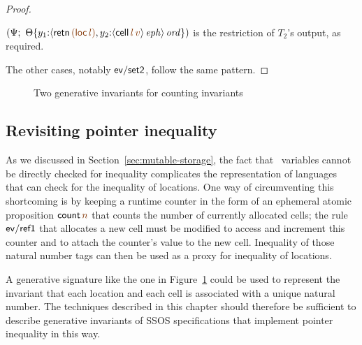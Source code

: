 \begin{proof}
\begin{description}
$\left(\Psi; ~
   \tackon{\Theta}{y_1{:}\istrue{\susp{{\sf retn}\,\lf{({\sf loc}\,\lf{l})},
                   y_2{:}\iseph{\susp{{\sf cell}\,\lf{l}\,\lf{v}}}}}}
   \right)$ is the restriction of $T_2$'s output, as
required.






\end{description}
The other cases, notably ${\sf ev/set2}$, follow the 
same pattern.
\end{proof}


\begin{figure}
\caption{Two generative invariants for counting invariants}
\label{fig:gen-countstate}
\end{figure}
\subsection{Revisiting pointer inequality}
\label{sec:pointer-inequality}

As we discussed in Section~\ref{sec:mutable-storage}, the fact that
\sls~variables cannot be directly checked for inequality complicates
the representation of languages that can check for the inequality of
locations. One way of circumventing this shortcoming is by keeping a
runtime counter in the form of an ephemeral atomic proposition ${\sf
  count}\,\lf{n}$ that counts the number of currently allocated cells;
the rule ${\sf ev/ref1}$ that allocates a new cell must be modified
to access and increment this counter and to attach the counter's value
to the new cell. Inequality of those natural number tags can then be
used as a proxy for inequality of locations.

A generative signature like the one in Figure~\ref{fig:gen-countstate}
could be used to represent the invariant that each location and each
cell is associated with a unique natural number. The techniques
described in this chapter should therefore be sufficient to describe
generative invariants of SSOS specifications that implement pointer
inequality in this way.


